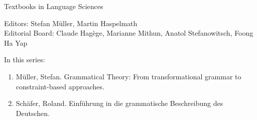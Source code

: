 {\large Textbooks in Language Sciences}

\bigskip

Editors: Stefan Müller, Martin Haspelmath  \\
Editorial Board: Claude Hagège, Marianne Mithun, Anatol Stefanowitsch, Foong Ha Yap

\bigskip

In this series:

\begin{enumerate}
\item Müller, Stefan. Grammatical Theory: From transformational grammar to constraint-based approaches.
\item Schäfer, Roland. Einführung in die grammatische Beschreibung des Deutschen.
\end{enumerate}




